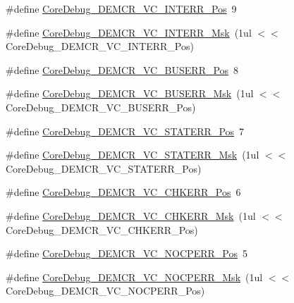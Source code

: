 \begin{DoxyCompactItemize}
\item 
\#define \mbox{\hyperlink{group___c_m_s_i_s___c_m3___core_debug_ga22079a6e436f23b90308be97e19cf07e}{Core\+Debug\+\_\+\+D\+E\+M\+C\+R\+\_\+\+V\+C\+\_\+\+I\+N\+T\+E\+R\+R\+\_\+\+Pos}}~9
\item 
\#define \mbox{\hyperlink{group___c_m_s_i_s___c_m3___core_debug_gad6815d8e3df302d2f0ff2c2c734ed29a}{Core\+Debug\+\_\+\+D\+E\+M\+C\+R\+\_\+\+V\+C\+\_\+\+I\+N\+T\+E\+R\+R\+\_\+\+Msk}}~(1ul $<$$<$ Core\+Debug\+\_\+\+D\+E\+M\+C\+R\+\_\+\+V\+C\+\_\+\+I\+N\+T\+E\+R\+R\+\_\+\+Pos)
\item 
\#define \mbox{\hyperlink{group___c_m_s_i_s___c_m3___core_debug_gab8e3d8f0f9590a51bbf10f6da3ad6933}{Core\+Debug\+\_\+\+D\+E\+M\+C\+R\+\_\+\+V\+C\+\_\+\+B\+U\+S\+E\+R\+R\+\_\+\+Pos}}~8
\item 
\#define \mbox{\hyperlink{group___c_m_s_i_s___c_m3___core_debug_ga9d29546aefe3ca8662a7fe48dd4a5b2b}{Core\+Debug\+\_\+\+D\+E\+M\+C\+R\+\_\+\+V\+C\+\_\+\+B\+U\+S\+E\+R\+R\+\_\+\+Msk}}~(1ul $<$$<$ Core\+Debug\+\_\+\+D\+E\+M\+C\+R\+\_\+\+V\+C\+\_\+\+B\+U\+S\+E\+R\+R\+\_\+\+Pos)
\item 
\#define \mbox{\hyperlink{group___c_m_s_i_s___c_m3___core_debug_ga16f0d3d2ce1e1e8cd762d938ac56c4ac}{Core\+Debug\+\_\+\+D\+E\+M\+C\+R\+\_\+\+V\+C\+\_\+\+S\+T\+A\+T\+E\+R\+R\+\_\+\+Pos}}~7
\item 
\#define \mbox{\hyperlink{group___c_m_s_i_s___c_m3___core_debug_gaa38b947d77672c48bba1280c0a642e19}{Core\+Debug\+\_\+\+D\+E\+M\+C\+R\+\_\+\+V\+C\+\_\+\+S\+T\+A\+T\+E\+R\+R\+\_\+\+Msk}}~(1ul $<$$<$ Core\+Debug\+\_\+\+D\+E\+M\+C\+R\+\_\+\+V\+C\+\_\+\+S\+T\+A\+T\+E\+R\+R\+\_\+\+Pos)
\item 
\#define \mbox{\hyperlink{group___c_m_s_i_s___c_m3___core_debug_ga10fc7c53bca904c128bc8e1a03072d50}{Core\+Debug\+\_\+\+D\+E\+M\+C\+R\+\_\+\+V\+C\+\_\+\+C\+H\+K\+E\+R\+R\+\_\+\+Pos}}~6
\item 
\#define \mbox{\hyperlink{group___c_m_s_i_s___c_m3___core_debug_ga2f98b461d19746ab2febfddebb73da6f}{Core\+Debug\+\_\+\+D\+E\+M\+C\+R\+\_\+\+V\+C\+\_\+\+C\+H\+K\+E\+R\+R\+\_\+\+Msk}}~(1ul $<$$<$ Core\+Debug\+\_\+\+D\+E\+M\+C\+R\+\_\+\+V\+C\+\_\+\+C\+H\+K\+E\+R\+R\+\_\+\+Pos)
\item 
\#define \mbox{\hyperlink{group___c_m_s_i_s___c_m3___core_debug_gac9d13eb2add61f610d5ced1f7ad2adf8}{Core\+Debug\+\_\+\+D\+E\+M\+C\+R\+\_\+\+V\+C\+\_\+\+N\+O\+C\+P\+E\+R\+R\+\_\+\+Pos}}~5
\item 
\#define \mbox{\hyperlink{group___c_m_s_i_s___c_m3___core_debug_ga03ee58b1b02fdbf21612809034562f1c}{Core\+Debug\+\_\+\+D\+E\+M\+C\+R\+\_\+\+V\+C\+\_\+\+N\+O\+C\+P\+E\+R\+R\+\_\+\+Msk}}~(1ul $<$$<$ Core\+Debug\+\_\+\+D\+E\+M\+C\+R\+\_\+\+V\+C\+\_\+\+N\+O\+C\+P\+E\+R\+R\+\_\+\+Pos)
$$
\end{DoxyCompactItemize}
